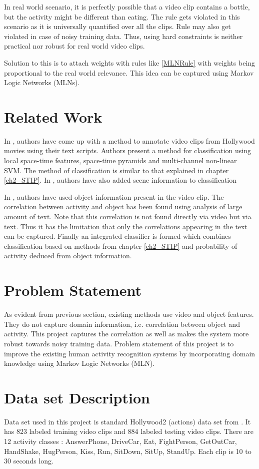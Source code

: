 In real world scenario, it is perfectly possible that a video clip contains a bottle,
but the activity might be different than eating. 
The rule gets violated in this scenario as it is universally quantified over all the clips. 
Rule may also get violated in case of noisy training data. 
Thus, using hard constraints is neither practical nor robust for real world video clips. 

Solution to this is to attach weights with rules like \eqref{MLNRule} with weights being proportional to the real world relevance.
This idea can be captured using Markov Logic Networks (MLNs).

\section{Related Work}
In \cite{Realistic}, authors have come up with a method to annotate video clips 
from Hollywood movies using their text scripts.
Authors present a method for classification using local space-time features, space-time pyramids 
and multi-channel non-linear SVM. The method of classification is similar to that explained in chapter \ref{ch2_STIP}. In \cite{actionsInContext}, authors have also added scene information to classification

In \cite{improving}, authors have used object information present in the video clip. 
The correlation between activity and object has been found using analysis of large amount of text. 
Note that this correlation is not found directly via video but via text.
Thus it has the limitation that only the correlations appearing in the text can be captured.
Finally an integrated classifier is formed which combines classification based on methods from chapter \ref{ch2_STIP} 
and probability of activity deduced from object information.

\section{Problem Statement}
As evident from previous section, existing methods use video and object features. They do not capture domain information, i.e. correlation between object and activity. 
This project captures the correlation as well as makes the system more robust towards noisy training data.
Problem statement of this project is to improve the existing human activity recognition systems
by incorporating domain knowledge using Markov Logic Networks (MLN).

\section{Data set Description}
Data set used in this project is standard Hollywood2 (actions) data set from \cite{actionsInContext}. 
It has 823 labeled training video clips and 884 labeled testing video clips. 
There are 12 activity classes : AnswerPhone, DriveCar, Eat, FightPerson,
 GetOutCar, HandShake, HugPerson, Kiss, Run, SitDown, SitUp, StandUp.
 Each clip is 10 to 30 seconds long.



